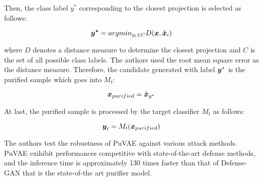 Then, the class label $y^*$ corresponding to the closest projection is selected as follows:

\begin{equation}
    \boldsymbol{y^*} = argmin_{y_{i} \in C} D(\boldsymbol{x}, \hat{\boldsymbol{x}}_{i})
\end{equation}

where $D$ denotes a distance measure to determine the closest projection and $C$
is the set of all possible class labels. The authors used the root mean square
error as the distance measure. Therefore, the candidate generated with label
$\boldsymbol{y}^*$ is the purified sample which goes into $M_{t}$:

\begin{equation}
    \boldsymbol{x}_{purified} = \hat{\boldsymbol{x}}_{y^*}
\end{equation}

At last, the purified sample is processed by the target classifier $M_{t}$ as follows:

\begin{equation}
    \boldsymbol{y}_{t} = M_{t}(\boldsymbol{x}_{purified})
\end{equation}

The authors test the robustness of PuVAE against various attack methods. PuVAE
exihibit performances competitive with state-of-the-art defense methods, and the
inference time is approximately 130 times faster than that of Defense-GAN that
is the state-of-the art purifier model.